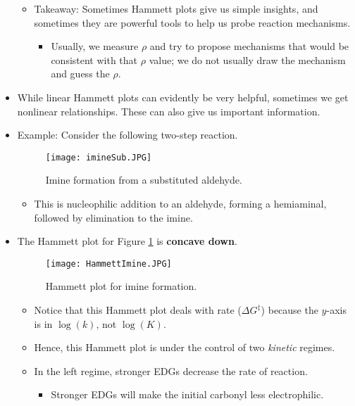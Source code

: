 \documentclass[../notes.tex]{subfiles}
\begin{document}
\begin{itemize}
\begin{itemize}
\begin{itemize}
\begin{itemize}
            \end{itemize}
        \end{itemize}
        \item Takeaway: Sometimes Hammett plots give us simple insights, and sometimes they are powerful tools to help us probe reaction mechanisms.
        \begin{itemize}
            \item Usually, we measure $\rho$ and try to propose mechanisms that would be consistent with that $\rho$ value; we do not usually draw the mechanism and guess the $\rho$.
        \end{itemize}
    \end{itemize}
    \item While linear Hammett plots can evidently be very helpful, sometimes we get nonlinear relationships. These can also give us important information.
    \item Example: Consider the following two-step reaction.
    \begin{figure}[h!]
        \centering
        \texttt{[image: imineSub.JPG]}
        \caption{Imine formation from a substituted aldehyde.}
        \label{fig:imineSub}
    \end{figure}
    \begin{itemize}
        \item This is nucleophilic addition to an aldehyde, forming a hemiaminal, followed by elimination to the imine.
    \end{itemize}
    \item The Hammett plot for Figure \ref{fig:imineSub} is \textbf{concave down}.
    \begin{figure}[h!]
        \centering
        \texttt{[image: HammettImine.JPG]}
        \caption{Hammett plot for imine formation.}
        \label{fig:HammettImine}
    \end{figure}
    \begin{itemize}
        \item Notice that this Hammett plot deals with rate ($\Delta G^\ddagger$) because the $y$-axis is in $\log(k)$, not $\log(K)$.
        \item Hence, this Hammett plot is under the control of two \emph{kinetic} regimes.
        \item In the left regime, stronger EDGs decrease the rate of reaction.
        \begin{itemize}
            \item Stronger EDGs will make the initial carbonyl less electrophilic.

\end{itemize}
\end{itemize}
\end{itemize}
\end{document}
